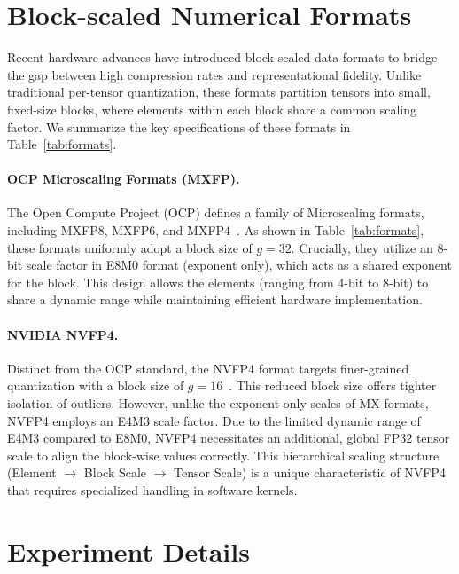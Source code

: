 \documentclass[11pt]{article}
\begin{document}
\clearpage

\appendix

\section{Block-scaled Numerical Formats}
\label{appendix:block_formats}

Recent hardware advances have introduced block-scaled data formats to bridge the gap between high compression rates and representational fidelity. Unlike traditional per-tensor quantization, these formats partition tensors into small, fixed-size blocks, where elements within each block share a common scaling factor. We summarize the key specifications of these formats in Table~\ref{tab:formats}.

\paragraph{OCP Microscaling Formats (MXFP).} 
The Open Compute Project (OCP) defines a family of Microscaling formats, including MXFP8, MXFP6, and MXFP4~\citep{rouhani2023microscalingdataformatsdeep}. 
As shown in Table~\ref{tab:formats}, these formats uniformly adopt a block size of $g=32$. 
Crucially, they utilize an 8-bit scale factor in E8M0 format (exponent only), which acts as a shared exponent for the block. 
This design allows the elements (ranging from 4-bit to 8-bit) to share a dynamic range while maintaining efficient hardware implementation.

\paragraph{NVIDIA NVFP4.} 
Distinct from the OCP standard, the NVFP4 format targets finer-grained quantization with a block size of $g=16$~\citep{nvidia2024nvfp4}. 
This reduced block size offers tighter isolation of outliers. 
However, unlike the exponent-only scales of MX formats, NVFP4 employs an E4M3 scale factor. 
Due to the limited dynamic range of E4M3 compared to E8M0, NVFP4 necessitates an additional, global FP32 tensor scale to align the block-wise values correctly. 
This hierarchical scaling structure (Element $\to$ Block Scale $\to$ Tensor Scale) is a unique characteristic of NVFP4 that requires specialized handling in software kernels.



\section{Experiment Details}
\label{appendix:details}
\end{document}
